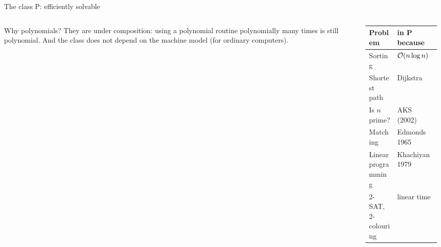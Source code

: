 \begin{frame}{The class P: efficiently solvable}
\begin{columns}[T]
\begin{column}{0.5\textwidth}
\vspace{2mm}

\small Why polynomials? They are  under composition: using a polynomial routine polynomially many times is still polynomial. And the class does not depend on the machine model (for ordinary computers).
\end{column}
\begin{column}{0.46\textwidth}
\small
\begin{tabular}{@{}L{26mm}L{28mm}@{}}
\toprule
\textbf{Problem} & \textbf{in P because}\\\midrule
Sorting & $\mathcal{O}(n\log n)$\\
Shortest path & Dijkstra\\
Is $n$ prime? & AKS (2002)\\
Matching & Edmonds 1965\\
Linear programming & Khachiyan 1979\\
2-SAT, 2-colouring & linear time\\\bottomrule
\end{tabular}
\end{column}
\end{columns}
\end{frame}




